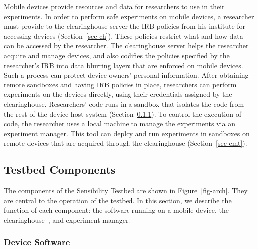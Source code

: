 Mobile devices
provide resources and data for researchers to use in their
experiments. In order to perform safe experiments on mobile
devices, a researcher must provide to the clearinghouse server
the IRB policies from his institute for accessing devices 
(Section~\ref{sec-ch}).  These 
policies restrict what and how data can be accessed by the 
researcher. The
clearinghouse server helps the researcher acquire and manage
devices, and also codifies the policies specified by the
researcher's IRB into data blurring layers that are enforced on
mobile devices. Such a process can protect device
owners' personal information. After obtaining remote sandboxes
and having IRB policies in place, researchers can perform
experiments on the devices directly, using their credentials assigned by
the clearinghouse. Researchers' code runs in a sandbox 
that isolates the code from the rest of the device
host system (Section~\ref{sec-repy}). To control the execution of 
code, the researcher uses a local machine to manage the 
experiments via an experiment manager. This tool can deploy 
and run experiments in sandboxes on remote devices that are 
acquired through the clearinghouse (Section~\ref{sec-emt}).



\subsection{Testbed Components}\label{sec-component}

The components of the Sensibility Testbed are shown in Figure~\ref{fig-arch}.
They are central to the operation of the testbed. 
In this section, we describe the function of each component: the
software running on a mobile device, the clearinghouse~\cite{ch}, 
and experiment manager.

\subsubsection{Device Software}\label{sec-repy}

